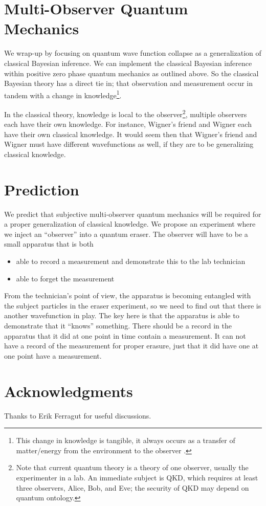 \documentclass[12pt,a4paper]{article}
\begin{document}
\section{Multi-Observer Quantum Mechanics}
We wrap-up by focusing on quantum wave function collapse as a generalization of classical Bayesian inference.  We can implement the classical Bayesian inference within positive zero phase quantum mechanics as outlined above.  So the classical Bayesian theory has a direct tie in; that observation and measurement occur in tandem with a change in knowledge\footnote{This change in knowledge is tangible, it always occurs as a transfer of matter/energy from the environment to the observer \cite{thrust}.}.  

In the classical theory, knowledge is local to the observer\footnote{Note that current quantum theory is a theory of one observer, usually the experimenter in a lab.  An immediate subject is QKD, which requires at least three observers, Alice, Bob, and Eve; the security of QKD may depend on quantum ontology.}, multiple observers each have their own knowledge.  For instance, Wigner's friend and Wigner each have their own classical knowledge.  It would seem then that Wigner's friend and Wigner must have different wavefunctions as well, if they are to be generalizing classical knowledge.

\section{Prediction}

We predict that subjective multi-observer quantum mechanics will be required for a proper generalization of classical knowledge.  We propose an experiment where we inject an ``observer'' into a quantum eraser.  The observer will have to be a small apparatus that is both
\begin{itemize}
   \item able to record a measurement and demonstrate this to the lab technician
   \item able to forget the measurement
\end{itemize}
From the technician's point of view, the apparatus is becoming entangled with the subject particles in the eraser experiment, so we need to find out that there is another wavefunction in play.  The key here is that the apparatus is able to demonstrate that it ``knows'' something.  There should be a record in the apparatus that it did at one point in time contain a measurement.  It can not have a record of the measurement for proper erasure, just that it did have one at one point have a measurement.

\section{Acknowledgments}
Thanks to Erik Ferragut for useful discussions.



\end{document}
